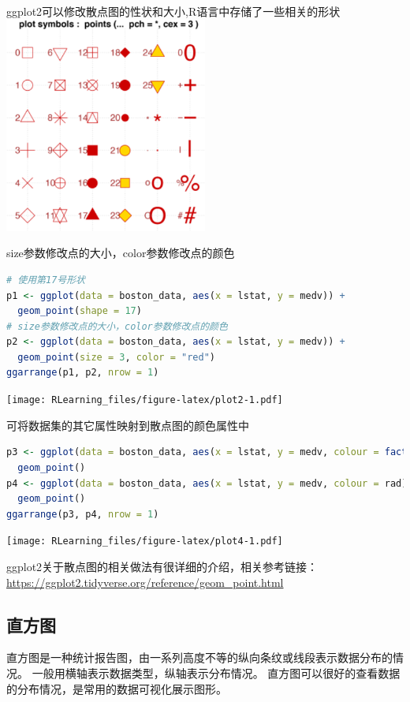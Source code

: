\documentclass[]{ctexbook}
\begin{document}
ggplot2可以修改散点图的性状和大小,R语言中存储了一些相关的形状
\includegraphics[width=0.5\textwidth,height=\textheight]{./image/task04_fig1.png}

size参数修改点的大小，color参数修改点的颜色

\begin{lstlisting}[language=R]
# 使用第17号形状
p1 <- ggplot(data = boston_data, aes(x = lstat, y = medv)) +
  geom_point(shape = 17)
# size参数修改点的大小，color参数修改点的颜色
p2 <- ggplot(data = boston_data, aes(x = lstat, y = medv)) +
  geom_point(size = 3, color = "red")
ggarrange(p1, p2, nrow = 1)
\end{lstlisting}

\texttt{[image: RLearning\_files/figure-latex/plot2-1.pdf]}

可将数据集的其它属性映射到散点图的颜色属性中

\begin{lstlisting}[language=R]
p3 <- ggplot(data = boston_data, aes(x = lstat, y = medv, colour = factor(rad))) +
  geom_point()
p4 <- ggplot(data = boston_data, aes(x = lstat, y = medv, colour = rad)) +
  geom_point()
ggarrange(p3, p4, nrow = 1)
\end{lstlisting}

\texttt{[image: RLearning\_files/figure-latex/plot4-1.pdf]}

ggplot2关于散点图的相关做法有很详细的介绍，相关参考链接：\url{https://ggplot2.tidyverse.org/reference/geom_point.html}

\hypertarget{ux76f4ux65b9ux56fe}{%
\subsection{直方图}\label{ux76f4ux65b9ux56fe}}

直方图是一种统计报告图，由一系列高度不等的纵向条纹或线段表示数据分布的情况。 一般用横轴表示数据类型，纵轴表示分布情况。
直方图可以很好的查看数据的分布情况，是常用的数据可视化展示图形。
\end{document}
